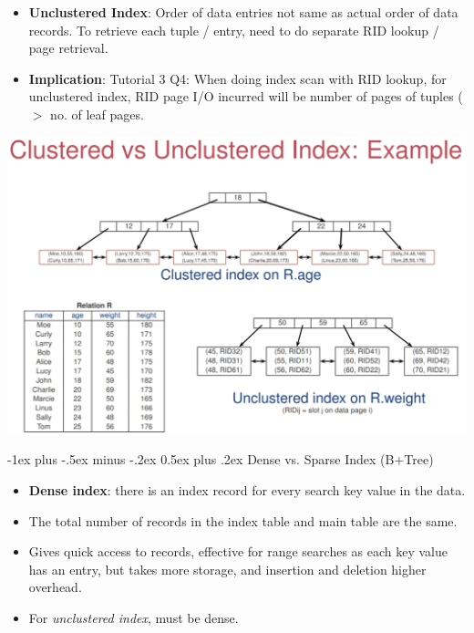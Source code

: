 \documentclass[10pt, landscape]{article}
\makeatletter
\renewcommand{\section}{\@startsection{section}{1}{0mm}%
                                {-1ex plus -.5ex minus -.2ex}%
                                {0.5ex plus .2ex}%
                                {\normalfont\large\bfseries}}
\makeatother
\begin{document}
\begin{multicols*}{3}
\begin{itemize}
\item \textbf{Unclustered Index}: Order of data entries not same as actual order of data records. To retrieve each tuple / entry, need to do separate RID lookup / page retrieval. 
\item \textbf{Implication}: Tutorial 3 Q4: When doing index scan with RID lookup, for unclustered index, RID page I/O incurred will be number of pages of tuples ($>$ no. of leaf pages.
\end{itemize}
\centerline{\includegraphics[width = 0.95\linewidth]{clusteredIndex}}

\section{Dense vs. Sparse Index (B+Tree)}
\begin{itemize}
\item \textbf{Dense index}: there is an index record for every search key value in the data.
\item The total number of records in the index table and main table are the same.
\item Gives quick access to records, effective for range searches as each key value has an entry, but takes more storage, and insertion and deletion higher overhead.
\item For \textit{unclustered index}, must be dense.


\end{itemize}
\end{multicols*}
\end{document}
